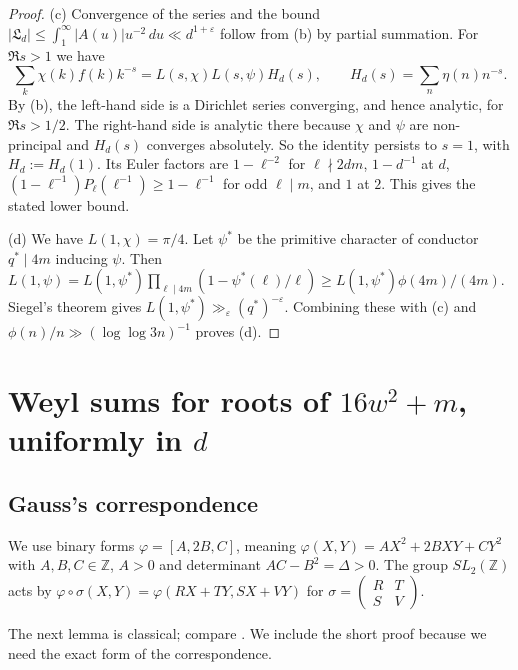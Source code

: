 \documentclass[11pt]{amsart}
\theoremstyle{remark}
\theoremstyle{definition}
\numberwithin{equation}{section}
\newcommand{\Z}{\mathbb{Z}}
\newcommand{\eps}{\varepsilon}
\newcommand{\Lf}{\mathfrak{L}}
\begin{document}
\begin{proof}
(c) Convergence of the series and the bound $|\Lf_d|\le\int_1^\infty|A(u)|u^{-2}\,du\ll d^{1+\eps}$ follow from (b) by partial summation. For $\Re s>1$ we have
\[
\sum_k\chi(k)f(k)k^{-s}=L(s,\chi)L(s,\psi)H_d(s),\qquad H_d(s)=\sum_n\eta(n)n^{-s}.
\]
By (b), the left-hand side is a Dirichlet series converging, and hence analytic, for $\Re s>1/2$. The right-hand side is analytic there because $\chi$ and $\psi$ are non-principal and $H_d(s)$ converges absolutely. So the identity persists to $s=1$, with $H_d:=H_d(1)$. Its Euler factors are $1-\ell^{-2}$ for $\ell\nmid 2dm$, $1-d^{-1}$ at $d$, $(1-\ell^{-1})P_\ell(\ell^{-1})\ge 1-\ell^{-1}$ for odd $\ell\mid m$, and $1$ at $2$. This gives the stated lower bound.

(d) We have $L(1,\chi)=\pi/4$. Let $\psi^*$ be the primitive character of conductor $q^*\mid 4m$ inducing $\psi$. Then $L(1,\psi)=L(1,\psi^*)\prod_{\ell\mid 4m}(1-\psi^*(\ell)/\ell)\ge L(1,\psi^*)\phi(4m)/(4m)$. Siegel's theorem \cite[Ch.~21]{Da} gives $L(1,\psi^*)\gg_\eps (q^*)^{-\eps}$. Combining these with (c) and $\phi(n)/n\gg(\log\log 3n)^{-1}$ proves (d).
\end{proof}

\section{\texorpdfstring{Weyl sums for roots of $16w^2+m$, uniformly in $d$}{Weyl sums for quadratic roots, uniformly in d}}\label{sec:weyl}

\subsection{Gauss's correspondence}
We use binary forms $\varphi=[A,2B,C]$, meaning $\varphi(X,Y)=AX^2+2BXY+CY^2$ with $A,B,C\in\Z$, $A>0$ and determinant $AC-B^2=\Delta>0$. The group $SL_2(\Z)$ acts by $\varphi\circ\sigma(X,Y)=\varphi(RX+TY,SX+VY)$ for $\sigma=\left(\begin{smallmatrix}R&T\\ S&V\end{smallmatrix}\right)$.

The next lemma is classical; compare \cite[Lemma~5 and its Corollary]{FI78}. We include the short proof because we need the exact form of the correspondence.
\end{document}
